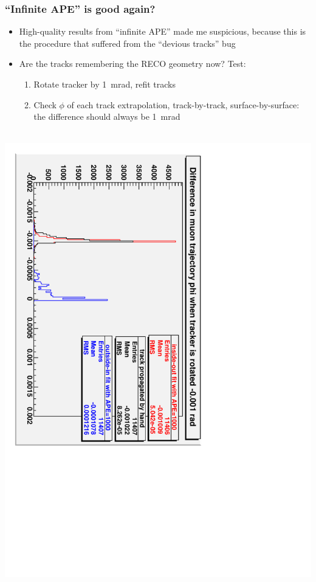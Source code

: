 \documentclass[compress]{beamer}
\begin{document}
\begin{frame}
\frametitle{``Infinite APE'' is good again?}

\small

\begin{itemize}
\item High-quality results from ``infinite APE'' made me suspicious,
because this is the procedure that suffered from the ``devious tracks'' bug
\item Are the tracks remembering the RECO geometry now?  Test:
\begin{enumerate}
\item Rotate tracker by 1~mrad, refit tracks
\item Check $\phi$ of each track extrapolation, track-by-track,
surface-by-surface: the difference should always be 1~mrad
\end{enumerate}
\end{itemize}

\mbox{ } \hfill \includegraphics[height=0.7\linewidth, angle=90]{phi_propagation_differences.pdf} \hfill \mbox{ }
\end{frame}
\end{document}
